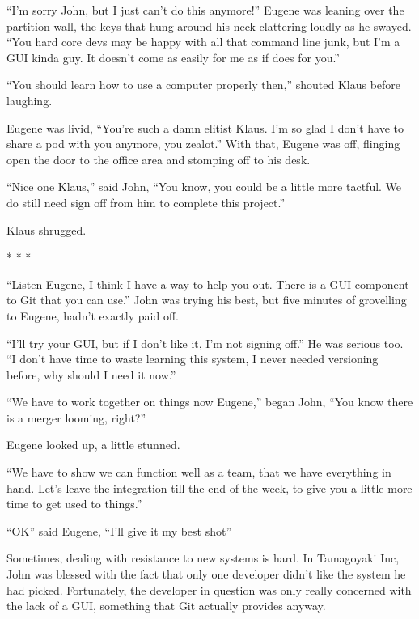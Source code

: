 \begin{trenches}
``I'm sorry John, but I just can't do this anymore!''  Eugene was leaning over the partition wall, the keys that hung around his neck clattering loudly as he swayed.  ``You hard core devs may be happy with all that command line junk, but I'm a GUI kinda guy.  It doesn't come as easily for me as if does for you.''

``You should learn how to use a computer properly then,'' shouted Klaus before laughing.

Eugene was livid, ``You're such a damn elitist Klaus.  I'm so glad I don't have to share a pod with you anymore, you zealot.''  With that, Eugene was off, flinging open the door to the office area and stomping off to his desk.

``Nice one Klaus,'' said John, ``You know, you could be a little more tactful.  We do still need sign off from him to complete this project.''

Klaus shrugged.

\begin{center} * * * \end{center}

``Listen Eugene, I think I have a way to help you out.  There is a GUI component to Git that you can use.''  John was trying his best, but five minutes of grovelling to Eugene, hadn't exactly paid off.

``I'll try your GUI, but if I don't like it, I'm not signing off.''  He was serious too.  ``I don't have time to waste learning this system, I never needed versioning before, why should I need it now.''

``We have to work together on things now Eugene,'' began John, ``You know there is a merger looming, right?''  

Eugene looked up, a little stunned.

``We have to show we can function well as a team, that we have everything in hand.  Let's leave the integration till the end of the week, to give you a little more time to get used to things.''

``OK'' said Eugene, ``I'll give it my best shot''
\end{trenches}

Sometimes, dealing with resistance to new systems is hard.  In Tamagoyaki Inc, John was blessed with the fact that only one developer didn't like the system he had picked.  Fortunately, the developer in question was only really concerned with the lack of a GUI, something that Git actually provides anyway.

